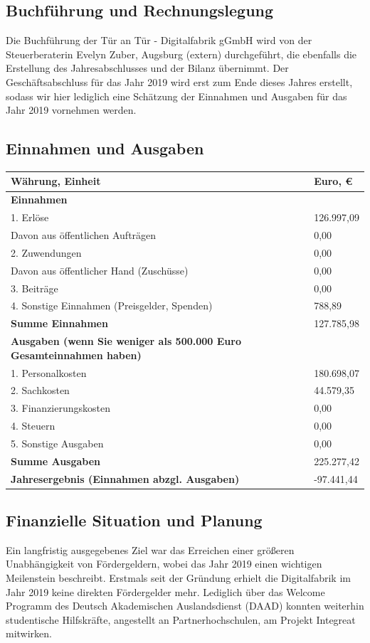 \documentclass[12pt, a4paper]{article} %
\begin{document}
\hypertarget{buchfuxfchrung-und-rechnungslegung}{%
\subsection{Buchführung und
Rechnungslegung}\label{buchfuxfchrung-und-rechnungslegung}}

Die Buchführung der Tür an Tür - Digitalfabrik gGmbH wird von der
Steuerberaterin Evelyn Zuber, Augsburg (extern) durchgeführt, die
ebenfalls die Erstellung des Jahresabschlusses und der Bilanz übernimmt.
Der Geschäftsabschluss für das Jahr 2019 wird erst zum Ende dieses
Jahres erstellt, sodass wir hier lediglich eine Schätzung der Einnahmen
und Ausgaben für das Jahr 2019 vornehmen werden.

\hypertarget{einnahmen-und-ausgaben}{%
\subsection{Einnahmen und Ausgaben}\label{einnahmen-und-ausgaben}}

\noindent\begin{tabularx}{\textwidth}{Xp{2cm}}
  \toprule
  \textbf{Währung, Einheit} & \textbf{Euro, \euro}\tabularnewline
  \midrule
  \textbf{Einnahmen} &\tabularnewline
  1. Erlöse & 126.997,09\tabularnewline
  Davon aus öffentlichen Aufträgen & 0,00\tabularnewline
  2. Zuwendungen & 0,00\tabularnewline
  Davon aus öffentlicher Hand (Zuschüsse) & 0,00\tabularnewline
  3. Beiträge & 0,00\tabularnewline
  4. Sonstige Einnahmen (Preisgelder, Spenden) & 788,89\tabularnewline
  \textbf{Summe Einnahmen} & 127.785,98\tabularnewline
  \midrule
  \textbf{Ausgaben (wenn Sie weniger als 500.000 Euro Gesamteinnahmen
  haben)} &\tabularnewline
  1. Personalkosten & 180.698,07\tabularnewline
  2. Sachkosten & 44.579,35\tabularnewline
  3. Finanzierungskosten & 0,00\tabularnewline
  4. Steuern & 0,00\tabularnewline
  5. Sonstige Ausgaben & 0,00\tabularnewline
  \textbf{Summe Ausgaben} & 225.277,42\tabularnewline
  \midrule
  \textbf{Jahresergebnis (Einnahmen abzgl. Ausgaben)} &
  -97.441,44\tabularnewline
  \bottomrule
  \end{tabularx}

\hypertarget{finanzielle-situation-und-planung}{%
\subsection{Finanzielle Situation und
Planung}\label{finanzielle-situation-und-planung}}

Ein langfristig ausgegebenes Ziel war das Erreichen einer größeren
Unabhängigkeit von Fördergeldern, wobei das Jahr 2019 einen wichtigen
Meilenstein beschreibt. Erstmals seit der Gründung erhielt die
Digitalfabrik im Jahr 2019 keine direkten Fördergelder mehr. Lediglich
über das Welcome Programm des Deutsch Akademischen Auslandsdienst (DAAD)
konnten weiterhin studentische Hilfskräfte, angestellt an
Partnerhochschulen, am Projekt Integreat mitwirken.
\end{document}
